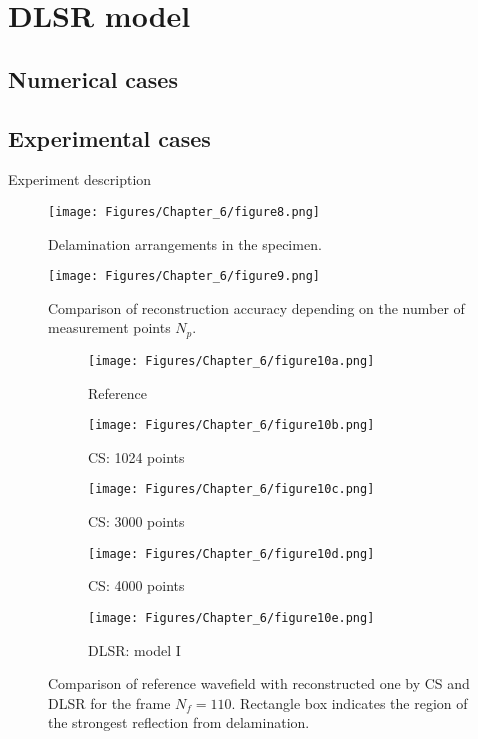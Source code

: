 \section{DLSR model}
\label{sec64}

\subsection{Numerical cases}

\subsection{Experimental cases}

Experiment description

\begin{figure} [h!]
	\centering
	\texttt{[image: Figures/Chapter\_6/figure8.png]}
	\caption{Delamination arrangements in the specimen.}
	\label{fig:specime}
\end{figure}

\begin{figure} [h!]
	\centering
	\texttt{[image: Figures/Chapter\_6/figure9.png]}
	\caption{Comparison of reconstruction accuracy depending on the number of measurement points $N_p$.}
	\label{fig:points_metrics}
\end{figure}

\begin{figure} [h!]
	\centering
	\begin{subfigure}[b]{0.32\textwidth}
		\centering
		\texttt{[image: Figures/Chapter\_6/figure10a.png]}
		\caption{Reference}
		\label{fig:frame110_ref}
	\end{subfigure}
	\hfill
	\begin{subfigure}[b]{0.32\textwidth}
		\centering
		\texttt{[image: Figures/Chapter\_6/figure10b.png]}
		\caption{CS: 1024 points}
		\label{fig:frame110_CS1024}
	\end{subfigure}
	\hfill
	\begin{subfigure}[b]{0.32\textwidth}
		\centering
		\texttt{[image: Figures/Chapter\_6/figure10c.png]}
		\caption{CS: 3000 points}
		\label{fig:frame110_CS3000}
	\end{subfigure}	
	\hfill
	\begin{subfigure}[b]{0.32\textwidth}
		\centering
		\texttt{[image: Figures/Chapter\_6/figure10d.png]}
		\caption{CS: 4000 points}
		\label{fig:frame110_CS4000}
	\end{subfigure}
	\begin{subfigure}[b]{0.32\textwidth}
		\centering
		\texttt{[image: Figures/Chapter\_6/figure10e.png]}
		\caption{DLSR: model I}
		\label{fig:frame110_Abdalraheem}
	\end{subfigure}
	\caption{Comparison of reference wavefield with reconstructed one by CS and DLSR for the frame $N_f = 110$. Rectangle box indicates the region of the strongest reflection from delamination.}
	\label{fig:frame110_comparison}
\end{figure} 

